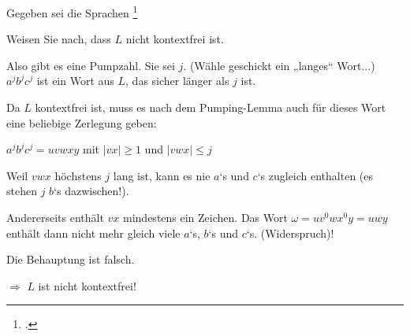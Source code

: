 \documentclass{bschlangaul-aufgabe}
\begin{document}

Gegeben sei die Sprachen
\footcite[Seite 42]{theo:fs:2}

\begin{center}
\end{center}

\noindent
Weisen Sie nach, dass $L$ nicht kontextfrei ist.

\begin{bExkurs}
\bPumpingKontextfrei
\end{bExkurs}

\begin{bAntwort}
Also gibt es eine Pumpzahl. Sie sei $j$. (Wähle geschickt ein „langes“
Wort...) $a^j b^j c^j$ ist ein Wort aus $L$, das sicher länger als $j$
ist.

Da $L$ kontextfrei ist, muss es nach dem Pumping-Lemma auch für
dieses Wort eine beliebige Zerlegung geben:

$a^j b^j c^j = uvwxy$ mit $|vx| \geq 1$ und $|vwx| \leq j$

Weil $vwx$ höchstens $j$ lang ist, kann es nie $a$‘s und $c$‘s
zugleich enthalten (es stehen $j$ $b$‘s dazwischen!).

Andererseits enthält $vx$ mindestens ein Zeichen. Das Wort $\omega
= uv^0 wx^0 y = uwy$ enthält dann nicht mehr gleich viele $a$‘s, $b$‘s
und $c$‘s. (Widerspruch)!

Die Behauptung ist falsch.

\noindent
$\Rightarrow$ $L$ ist nicht kontextfrei!

\end{bAntwort}
\end{document}
